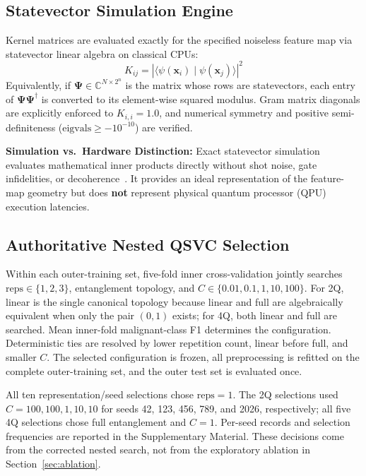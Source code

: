 \documentclass[12pt,a4paper]{article}
\begin{document}
\subsection{Statevector Simulation Engine}
Kernel matrices are evaluated exactly for the specified noiseless feature map via statevector linear algebra on classical CPUs:
\begin{equation}
K_{ij} = \left|\langle \psi(\mathbf{x}_i) \mid \psi(\mathbf{x}_j) \rangle\right|^2
\end{equation}
Equivalently, if $\mathbf{\Psi} \in \mathbb{C}^{N \times 2^n}$ is the matrix whose rows are statevectors, each entry of $\mathbf{\Psi}\mathbf{\Psi}^{\dagger}$ is converted to its element-wise squared modulus. Gram matrix diagonals are explicitly enforced to $K_{i,i} = 1.0$, and numerical symmetry and positive semi-definiteness ($\text{eigvals} \ge -10^{-10}$) are verified.

\noindent\textbf{Simulation vs.\ Hardware Distinction:} Exact statevector simulation evaluates mathematical inner products directly without shot noise, gate infidelities, or decoherence~\cite{peters2021machine}. It provides an ideal representation of the feature-map geometry but does \textbf{not} represent physical quantum processor (QPU) execution latencies.

\subsection{Authoritative Nested QSVC Selection}
Within each outer-training set, five-fold inner cross-validation jointly searches $\text{reps}\in\{1,2,3\}$, entanglement topology, and $C\in\{0.01,0.1,1,10,100\}$. For 2Q, linear is the single canonical topology because linear and full are algebraically equivalent when only the pair $(0,1)$ exists; for 4Q, both linear and full are searched. Mean inner-fold malignant-class F1 determines the configuration. Deterministic ties are resolved by lower repetition count, linear before full, and smaller $C$. The selected configuration is frozen, all preprocessing is refitted on the complete outer-training set, and the outer test set is evaluated once.

All ten representation/seed selections chose $\text{reps}=1$. The 2Q selections used $C=100,100,1,10,10$ for seeds 42, 123, 456, 789, and 2026, respectively; all five 4Q selections chose full entanglement and $C=1$. Per-seed records and selection frequencies are reported in the Supplementary Material. These decisions come from the corrected nested search, not from the exploratory ablation in Section~\ref{sec:ablation}.
\end{document}
